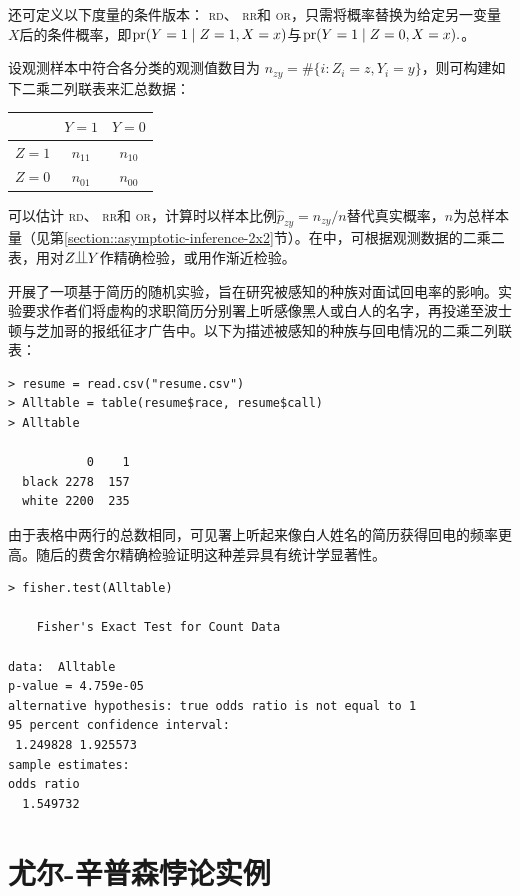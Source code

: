  
还可定义以下度量的条件版本： \textsc{rd}、 \textsc{rr}和 \textsc{or}，只需将概率替换为给定另一变量$X$后的条件概率，即$\textup{pr}(Y=1\mid Z=1, X=x) $与$ \textup{pr}(Y=1\mid Z=0, X=x)  .$。
 
 
设观测样本中符合各分类的观测值数目为 $n_{zy} = \#\{i:  Z_i=z, Y_i=y \}$，则可构建如下二乘二列联表来汇总数据：
 \begin{center}
\begin{tabular}{lcc}
\hline 
        & $Y =1$ & $Y =0$\\\hline
$Z =1$ & $n_{11}$ & $n_{10}$\\ 
$Z =0$ & $n_{01}$ & $n_{00}$\\ 
\hline 
\end{tabular}
\end{center}
可以估计  \textsc{rd}、 \textsc{rr}和 \textsc{or}，计算时以样本比例$\hat p_{zy} = n_{zy}  / n$替代真实概率，$n$为总样本量（见第\ref{section::asymptotic-inference-2x2}节）。在中，可根据观测数据的二乘二表，用对$Z \ind Y$作精确检验，或用作渐近检验。 
 
 
 \begin{example}\label{eg::bertrand2004emily-chapter1}
 \citet{bertrand2004emily} 开展了一项基于简历的随机实验，旨在研究被感知的种族对面试回电率的影响。实验要求作者们将虚构的求职简历分别署上听感像黑人或白人的名字，再投递至波士顿与芝加哥的报纸征才广告中。以下为描述被感知的种族与回电情况的二乘二列联表：
 
 \begin{lstlisting} 
> resume = read.csv("resume.csv")
> Alltable = table(resume$race, resume$call)
> Alltable
       
           0    1
  black 2278  157
  white 2200  235
    \end{lstlisting} 


由于表格中两行的总数相同，可见署上听起来像白人姓名的简历获得回电的频率更高。随后的费舍尔精确检验证明这种差异具有统计学显著性。
     \begin{lstlisting} 
> fisher.test(Alltable)

	Fisher's Exact Test for Count Data

data:  Alltable
p-value = 4.759e-05
alternative hypothesis: true odds ratio is not equal to 1
95 percent confidence interval:
 1.249828 1.925573
sample estimates:
odds ratio 
  1.549732 
  \end{lstlisting} 
 
 \end{example}
 
\section{尤尔-辛普森悖论实例} 

